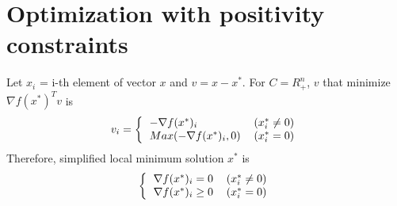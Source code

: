 \documentclass{article}
\begin{document}
\section{Optimization with positivity constraints}
Let $x_i$ = i-th element of vector $x$ and $v = x - x^*$. For $C = R_+^n$, $v$ that minimize $\nabla f(x^*)^Tv$ is
\[v_i = \bigg\{
\begin{tabular}{l r}
$-\nabla f(x^*)_i$ & $(x_i^* \neq 0)$ \\
$Max(-\nabla f(x^*)_i, 0)$ & $(x_i^* = 0)$
\end{tabular}\]
Therefore, simplified local minimum solution $x^*$ is
\[\bigg\{
\begin{tabular}{l r}
$\nabla f(x^*)_i = 0$ & $(x_i^* \neq 0)$ \\
$\nabla f(x^*)_i \geq 0$ & $(x_i^* = 0)$
\end{tabular}\]
\end{document}

